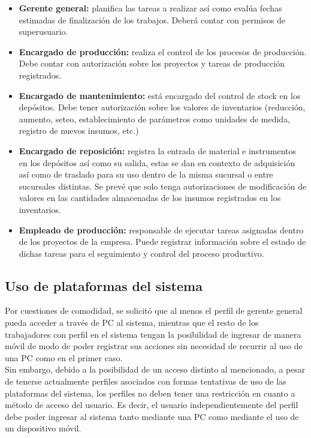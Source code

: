 \documentclass[a4paper, 12pt,twoside]{report}  %
\numberwithin{equation}{subsection} %
\begin{document}
\begin{itemize}
\item \textbf{Gerente general:} planifica las tareas a realizar así como evalúa fechas estimadas de finalización de los trabajos. Deberá contar con permisos de superusuario.
\item \textbf{Encargado de producción:} realiza el control de los procesos de producción. Debe contar con autorización sobre los proyectos y tareas de producción registrados.
\item \textbf{Encargado de mantenimiento:} está encargado del control de stock en los depósitos. Debe tener autorización sobre los valores de inventarios (reducción, aumento, seteo, establecimiento de parámetros como unidades de medida, registro de nuevos insumos, etc.)
\item \textbf{Encargado de reposición:} registra la entrada de material e instrumentos en los depósitos así como su salida, estas se dan en contexto de adquisición así como de traslado para su uso dentro de la misma sucursal o entre sucursales distintas. Se prevé que solo tenga autorizaciones de modificación de valores en las cantidades almacenadas de los insumos registrados en los inventarios.
\item \textbf{Empleado de producción:}
responsable de ejecutar tareas asignadas dentro de los proyectos de la empresa. Puede registrar información sobre el estado de dichas tareas para el seguimiento y control del proceso productivo.
\end{itemize}

\subsection{Uso de plataformas del sistema} Por cuestiones de comodidad, se solicitó que al menos el perfil de gerente general pueda acceder a través de PC al sistema, mientras que el resto de los trabajadores con perfil en el sistema tengan la posibilidad de ingresar de manera móvil de modo de poder registrar sus acciones sin necesidad de recurrir al uso de una PC como en el primer caso.\\
\indent Sin embargo, debido a la posibilidad de un acceso distinto al mencionado, a pesar de tenerse actualmente perfiles asociados con formas tentativas de uso de las plataformas del sistema, los perfiles no deben tener una restricción en cuanto a método de acceso del usuario. Es decir, el usuario independientemente del perfil debe poder ingresar al sistema tanto mediante una PC como mediante el uso de un dispositivo móvil.
\end{document}
